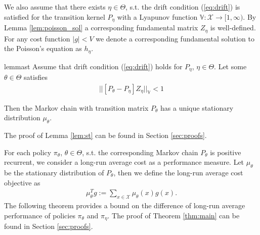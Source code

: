 \documentclass[11pt]{article}
\newcommand{\X}{\mathcal{X}}
\newcommand{\V}{\mathbb{V}}
\theoremstyle{definition}
\numberwithin{equation}{section}
\begin{document}
We also assume that there exists $\eta \in \Theta$, s.t. the drift condition (\ref{eq:drift}) is satisfied for the transition kernel $P_\eta$ with a Lyapunov function $\V:\X\rightarrow [1, \infty).$ By Lemma \ref{lem:poisson_sol}  a corresponding fundamental matrix   $Z_\eta$ is well-defined. For any cost function $|g|<V$ we denote a corresponding fundamental solution to the  Poisson's equation as $h_\eta$.    

%
%

\begin{restatable}{lemma}{st}\label{lem:st}
Assume that drift condition (\ref{eq:drift}) holds for $P_\eta$, $\eta \in \Theta$. Let some $\theta\in \Theta$ satisfies\begin{align*}||  [P_{\theta} - P_{\eta}] Z_{\eta}||_\V < 1  \end{align*} 
 
Then the Markov chain with transition matrix $P_\theta$ has a unique stationary distribution $\mu_{\theta}$.
\end{restatable}
The proof of Lemma \ref{lem:st} can be found in Section \ref{sec:proofs}.

For each policy $\pi_\theta$, $\theta\in \Theta$, s.t. the corresponding Markov chain $P_\theta$ is positive recurrent,  we consider a long-run average cost as a performance measure. Let $\mu_\theta$ be the stationary distribution of $P_\theta$, then we define the long-run average cost  objective as
\begin{align}\label{eq:ac}
 \mu_\theta^Tg  := \sum\limits_{x\in \X} \mu_\theta(x) g(x).
\end{align}
 The following theorem provides a bound on the difference of long-run average performance of policies $\pi_\theta$ and $\pi_{\eta}$. The proof of Theorem \ref{thm:main} can be found in Section \ref{sec:proofs}.
\end{document}
